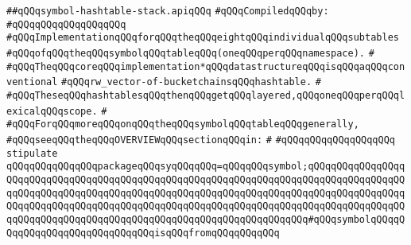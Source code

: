 \label{src/lib/compiler/front/typer-stuff/basics/symbol-hashtable-stack.api}
\verb|##qQQqsymbol-hashtable-stack.apiqQQq|\newline
\newline
\verb|#qQQqCompiledqQQqby:|\newline
\verb|#qQQqqQQqqQQqqQQqqQQq|\newline
\newline
\newline
\newline
\verb|#qQQqImplementationqQQqforqQQqtheqQQqeightqQQqindividualqQQqsubtables|\newline
\verb|#qQQqofqQQqtheqQQqsymbolqQQqtableqQQq(oneqQQqperqQQqnamespace).|\newline
\verb|#|\newline
\verb|#qQQqTheqQQqcoreqQQqimplementation*qQQqdatastructureqQQqisqQQqaqQQqconventional|\newline
\verb|#qQQqrw_vector-of-bucketchainsqQQqhashtable.|\newline
\verb|#|\newline
\verb|#qQQqTheseqQQqhashtablesqQQqthenqQQqgetqQQqlayered,qQQqoneqQQqperqQQqlexicalqQQqscope.|\newline
\verb|#|\newline
\verb|#qQQqForqQQqmoreqQQqonqQQqtheqQQqsymbolqQQqtableqQQqgenerally,|\newline
\verb|#qQQqseeqQQqtheqQQqOVERVIEWqQQqsectionqQQqin:|\newline
\verb|#|\newline
\verb|#qQQqqQQqqQQqqQQqqQQq|\newline
\newline
\newline
\verb|stipulate|\newline
\verb|qQQqqQQqqQQqqQQqpackageqQQqsyqQQqqQQq=qQQqqQQqsymbol;qQQqqQQqqQQqqQQqqQQqqQQqqQQqqQQqqQQqqQQqqQQqqQQqqQQqqQQqqQQqqQQqqQQqqQQqqQQqqQQqqQQqqQQqqQQqqQQqqQQqqQQqqQQqqQQqqQQqqQQqqQQqqQQqqQQqqQQqqQQqqQQqqQQqqQQqqQQqqQQqqQQqqQQqqQQqqQQqqQQqqQQqqQQqqQQqqQQqqQQqqQQqqQQqqQQqqQQqqQQqqQQqqQQqqQQqqQQqqQQqqQQqqQQqqQQqqQQqqQQqqQQqqQQqqQQqqQQqqQQq#qQQqsymbolqQQqqQQqqQQqqQQqqQQqqQQqqQQqqQQqisqQQqfromqQQqqQQqqQQq|\newline
